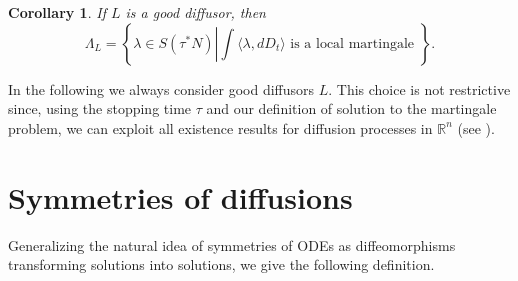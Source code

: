 \documentclass{article}[10pt]
\newtheorem{corollary}[theorem]{Corollary}
\begin{document}
\begin{corollary}
If $L$ is a good diffusor, then
$$\Lambda_L=\left\{ \lambda \in S(\tau^*N) \left| \int{\langle \lambda,dD_t\rangle} \text{ is a local martingale } \right. \right\}.$$
\end{corollary}

In the following  we always consider  good diffusors $L$. This choice is not restrictive since, using the stopping time $\tau$ and our definition of solution
to the martingale problem, we can exploit all existence results for diffusion processes in $\mathbb{R}^n$ (see \cite{Stroock1979}).

\section{Symmetries of diffusions}\label{section_symmetries}


Generalizing the natural idea of symmetries of ODEs as diffeomorphisms transforming solutions into solutions, we  give the following definition.
\end{document}

